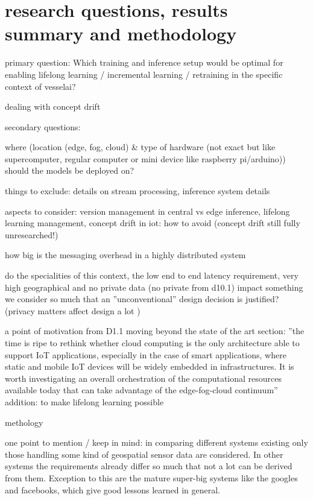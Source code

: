 

\section{research questions, results summary and methodology}

primary question: Which training and inference setup would be optimal for enabling lifelong learning / incremental learning / retraining in the specific context of vesselai?

dealing with concept drift

secondary questions:

where (location (edge, fog, cloud) & type of hardware (not exact but like supercomputer, regular computer or mini device like raspberry pi/arduino)) should the models be deployed on?

things to exclude: details on stream processing, inference system details

aspects to consider: version management in central vs edge inference, lifelong learning management, concept drift in iot: how to avoid (concept drift still fully unresearched!)

how big is the messaging overhead in a highly distributed system

do the specialities of this context, the low end to end latency requirement, very high geographical and no private data (no private from d10.1) impact something we consider so much that an ''unconventional'' design decision is justified? (privacy matters affect design a lot \cite{iotsystems})

a point of motivation from D1.1 moving beyond the state of the art section: ''the time is ripe  to  rethink  whether  cloud  computing  is  the  only  architecture  able  to  support  IoT  applications, especially  in  the  case  of  smart applications,  where  static  and  mobile  IoT  devices  will  be  widely embedded  in  infrastructures.  It  is  worth  investigating  an  overall  orchestration  of  the  computational resources  available  today  that  can  take  advantage  of  the  edge-fog-cloud  continuum'' addition: to make lifelong learning possible

methology

one point to mention / keep in mind: in comparing different systems existing only those handling some kind of geospatial sensor data are considered. In other systems the requirements already differ so much that not a lot can be derived from them. Exception to this are the mature super-big systems like the googles and facebooks, which give good lessons learned in general.


